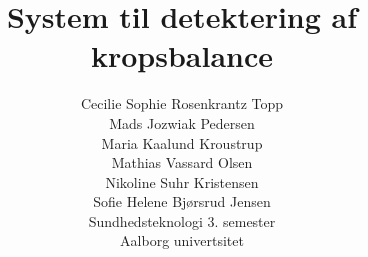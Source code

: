\title{\Huge System til detektering af kropsbalance}
\author{\Large %
Cecilie Sophie Rosenkrantz Topp \\ \Large Mads Jozwiak Pedersen \\ \Large Maria Kaalund Kroustrup \\ \Large Mathias Vassard Olsen \\ \Large Nikoline Suhr Kristensen \\ \Large Sofie Helene Bjørsrud Jensen \\
	\normalsize Sundhedsteknologi 3. semester\\
	\normalsize Aalborg univertsitet}
\maketitle
\vfill %

\clearpage